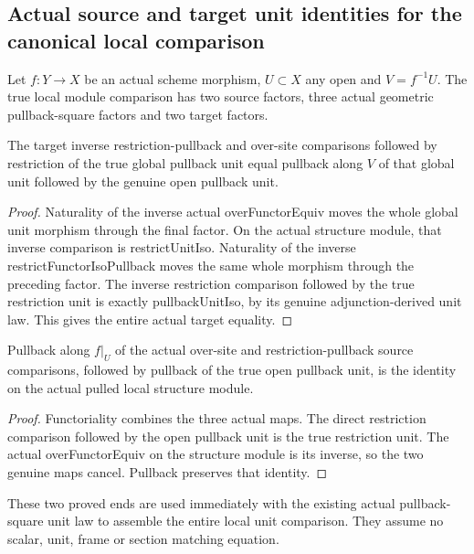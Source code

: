 \subsection{Actual source and target unit identities for the canonical local comparison}
Let $f:Y\to X$ be an actual scheme morphism, $U\subset X$ any open and
$V=f^{-1}U$. The true local module comparison has two source factors,
three actual geometric pullback-square factors and two target factors.
\begin{lemma}
\label{lem:seven-dual-unit-local-target}
\leanok
The target inverse restriction-pullback and over-site comparisons followed
by restriction of the true global pullback unit equal pullback along $V$
of that global unit followed by the genuine open pullback unit.
\end{lemma}
\begin{proof}
Naturality of the inverse actual overFunctorEquiv moves the whole global
unit morphism through the final factor. On the actual structure module,
that inverse comparison is restrictUnitIso. Naturality of the inverse
restrictFunctorIsoPullback moves the same whole morphism through the
preceding factor. The inverse restriction comparison followed by the
true restriction unit is exactly pullbackUnitIso, by its genuine
adjunction-derived unit law. This gives the entire actual target equality.
\end{proof}
\begin{lemma}
\label{lem:seven-dual-unit-local-source}
\leanok
Pullback along $f|_U$ of the actual over-site and restriction-pullback
source comparisons, followed by pullback of the true open pullback unit,
is the identity on the actual pulled local structure module.
\end{lemma}
\begin{proof}
Functoriality combines the three actual maps. The direct restriction
comparison followed by the open pullback unit is the true restriction
unit. The actual overFunctorEquiv on the structure module is its inverse,
so the two genuine maps cancel. Pullback preserves that identity.
\end{proof}
These two proved ends are used immediately with the existing actual
pullback-square unit law to assemble the entire local unit comparison.
They assume no scalar, unit, frame or section matching equation.

